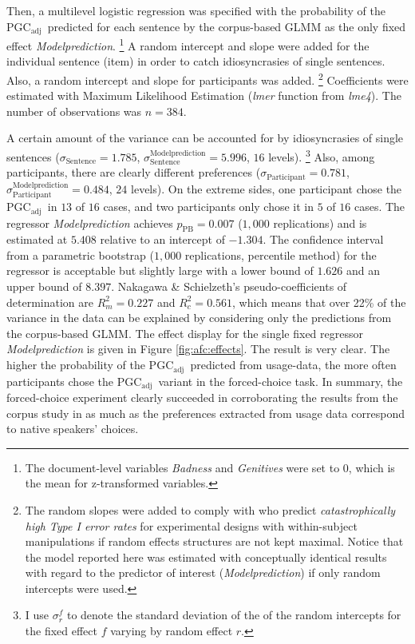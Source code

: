 \documentclass[USenglish]{article}
\newcommand{\Sub}[1]{\ensuremath{\mathrm{_{#1}}}}
\newcommand{\mpPB}{\ensuremath{p_{\text{PB}}}}
\newcommand{\PGCa}{PGC\Sub{adj}}
\begin{document}
Then, a multilevel logistic regression was specified with the probability of the \PGCa\ predicted for each sentence by the corpus-based GLMM as the only fixed effect \textit{Modelprediction}.%
\footnote{The document-level variables \textit{Badness} and \textit{Genitives} were set to $0$, which is the mean for z-transformed variables.}
A random intercept and slope were added for the individual sentence (item) in order to catch idiosyncrasies of single sentences.
Also, a random intercept and slope for participants was added.%
\footnote{The random slopes were added to comply with \citet[257]{BarrEa2013} who predict \textit{catastrophically high Type I error rates} for experimental designs with within-subject manipulations if random effects structures are not kept maximal.
Notice that the model reported here was estimated with conceptually identical results with regard to the predictor of interest (\textit{Modelprediction}) if only random intercepts were used.}
Coefficients were estimated with Maximum Likelihood Estimation (\textit{lmer} function from \textit{lme4}).
The number of observations was $n=384$.

A certain amount of the variance can be accounted for by idiosyncrasies of single sentences ($\sigma_{\text{Sentence}}=1.785$, $\sigma^{\text{Modelprediction}}_{\text{Sentence}}=5.996$, $16$ levels).%
\footnote{I use $\sigma^f_r$ to denote the standard deviation of the of the random intercepts for the fixed effect $f$ varying by random effect $r$.}
Also, among participants, there are clearly different preferences ($\sigma_{\text{Participant}}=0.781$, $\sigma^{\text{Modelprediction}}_{\text{Participant}}=0.484$, $24$ levels).
On the extreme sides, one participant chose the \PGCa\ in $13$ of $16$ cases, and two participants only chose it in $5$ of $16$ cases.
The regressor \textit{Modelprediction} achieves $\mpPB=0.007$ ($1,000$ replications) and is estimated at $5.408$ relative to an intercept of $-1.304$.
The confidence interval from a parametric bootstrap ($1,000$ replications, percentile method) for the regressor is acceptable but slightly large with a lower bound of $1.626$ and an upper bound of $8.397$.
Nakagawa \& Schielzeth's pseudo-coefficients of determination are $R^2_{m}=0.227$ and $R^2_{c}=0.561$, which means that over 22\% of the variance in the data can be explained by considering only the predictions from the corpus-based GLMM.
The effect display for the single fixed regressor \textit{Modelprediction} is given in Figure \ref{fig:afc:effects}.
The result is very clear.
The higher the probability of the \PGCa\ predicted from usage-data, the more often participants chose the \PGCa\ variant in the forced-choice task.
In summary, the forced-choice experiment clearly succeeded in corroborating the results from the corpus study in as much as the preferences extracted from usage data correspond to native speakers' choices.
\end{document}
